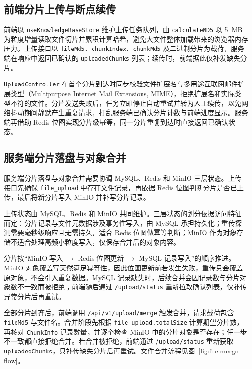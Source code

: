 \subsection{前端分片上传与断点续传}

前端以 \texttt{useKnowledgeBaseStore} 维护上传任务队列，由 \texttt{calculateMD5} 以 5~MB 为粒度增量读取文件切片并累积计算哈希，避免大文件整体加载带来的浏览器内存压力。上传接口以 \texttt{fileMd5}、\texttt{chunkIndex}、\texttt{chunkMd5} 及二进制分片为载荷，服务端在响应中返回已确认的 \texttt{uploadedChunks} 列表；续传时，前端据此仅补发缺失分片。

\texttt{UploadController} 在首个分片到达时同步校验文件扩展名与多用途互联网邮件扩展类型（Multipurpose Internet Mail Extensions, MIME），拒绝扩展名和实际类型不符的文件。分片发送失败后，任务立即停止自动重试并转为人工续传，以免网络抖动期间静默产生重复请求，打乱服务端已确认分片计数与前端进度显示。服务端再借助 Redis 位图实现分片级幂等，同一分片重复到达时直接返回已确认状态。

\subsection{服务端分片落盘与对象合并}

服务端分片落盘与对象合并需要协调 MySQL、Redis 和 MinIO 三层状态。上传接口先确保 \texttt{file\_upload} 中存在文件记录，再依据 Redis 位图判断分片是否已上传，最后将新分片写入 MinIO 并补写分片记录。

上传状态由 MySQL、Redis 和 MinIO 共同维护。三层状态的划分依据访问特征而定：分片记录与文件元数据涉及事务性写入，由 MySQL 承担持久化；重传探测需要毫秒级响应且无需持久，适合 Redis 位图做幂等判断；MinIO 作为对象存储不适合处理高频小粒度写入，仅保存合并后的对象内容。

分片按“MinIO 写入 $\to$ Redis 位图更新 $\to$ MySQL 记录写入”的顺序推进。MinIO 对象覆盖写天然满足幂等性，因此位图更新前若发生失败，重传只会覆盖原对象，不会引入重复数据。MySQL 记录缺失时，后续合并会因记录数与分片对象数不一致而被拒绝；前端随后通过 \texttt{/upload/status} 重新拉取确认列表，仅补传异常分片后再重试。

全部分片到齐后，前端调用 \texttt{/api/v1/upload/merge} 触发合并，请求载荷包含 \texttt{fileMd5} 与文件名。合并阶段先根据 \texttt{file\_upload.totalSize} 计算期望分片数，再核对 \texttt{ChunkInfo} 记录数量，并逐个检查 MinIO 中的分片对象是否存在；任一步不一致都直接拒绝合并。若合并被拒绝，前端通过 \texttt{/upload/status} 重新获取 \texttt{uploadedChunks}，只补传缺失分片后再重试。文件合并流程见图~\ref{fig:file-merge-flow}。

